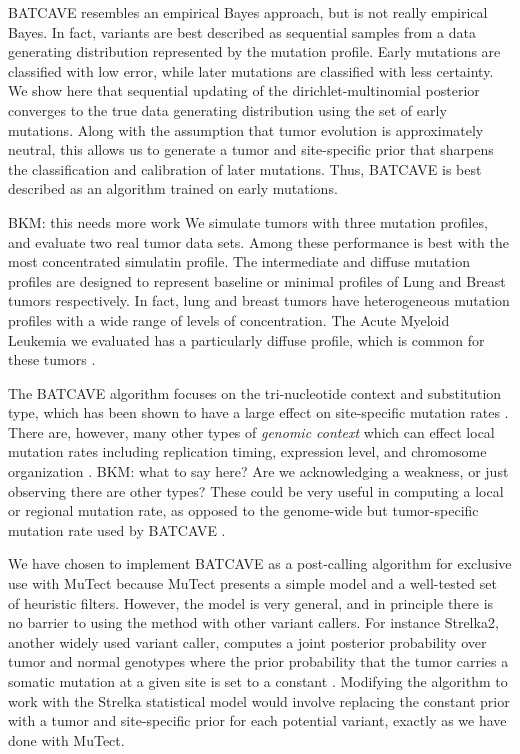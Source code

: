 \documentclass[a4,center,fleqn]{NAR}
\newcommand{\bkmcomment}[1]{{\color{blue}BKM: #1}}
\newcommand{\batcave}{BATCAVE }
\begin{document}
\batcave resembles an empirical Bayes approach, but is not really empirical Bayes.
In fact, variants are best described as sequential samples from a data generating distribution represented by the mutation profile.
Early mutations are classified with low error, while later mutations are classified with less certainty.
We show here that sequential updating of the dirichlet-multinomial posterior converges to the true data generating distribution using the set of early mutations.
Along with the assumption that tumor evolution is approximately neutral, this allows us to generate a tumor and site-specific prior that sharpens the classification and calibration of later mutations.
Thus, \batcave is best described as an algorithm trained on early mutations.

\bkmcomment{this needs more work}
We simulate tumors with three mutation profiles, and evaluate two real tumor data sets.
Among these performance is best with the most concentrated simulatin profile.
The intermediate and diffuse mutation profiles are designed to represent baseline or minimal profiles of Lung and Breast tumors respectively.
In fact, lung and breast tumors have heterogeneous mutation profiles with a wide range of levels of concentration.
The Acute Myeloid Leukemia we evaluated has a particularly diffuse profile, which is common for these tumors \cite{Alexandrov2019}.

The \batcave algorithm focuses on the tri-nucleotide context and substitution type, which has been shown to have a large effect on site-specific mutation rates \cite{Martincorena2015,Hollstein2017}.
There are, however, many other types of \textit{genomic context} which can effect local mutation rates including replication timing, expression level, and chromosome organization \cite{Buisson2019,Schuster-Bockler2012,Pleasance2010}.
\bkmcomment{what to say here? Are we acknowledging a weakness, or just observing there are other types?}
These could be very useful in computing a local or regional mutation rate, as opposed to the genome-wide but tumor-specific mutation rate used by \batcave.

We have chosen to implement \batcave as a post-calling algorithm for exclusive use with MuTect because MuTect presents a simple model and a well-tested set of heuristic filters.
However, the model is very general, and in principle there is no barrier to using the method with other variant callers.
For instance Strelka2, another widely used variant caller, computes a joint posterior probability over tumor and normal genotypes where the prior probability that the tumor carries a somatic mutation at a given site is set to a constant \cite{Kim2018}.
Modifying the algorithm to work with the Strelka statistical model would involve replacing the constant prior with a tumor and site-specific prior for each potential variant, exactly as we have done with MuTect.
\end{document}
